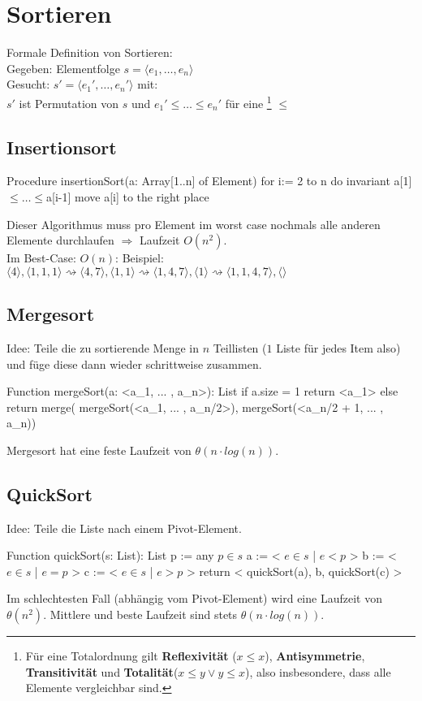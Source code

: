 \section{Sortieren}
Formale Definition von Sortieren:\\
Gegeben: Elementfolge $s = \langle e_1, \dots, e_n \rangle$\\
Gesucht: $s'=\langle e_1',\dots,e_n'\rangle$ mit:\\
$s'$ ist Permutation von $s$ und $e_1'\leq\dots\leq e_n'$ für eine 
 \footnote{Für eine Totalordnung gilt \textbf{Reflexivität} ($x\leq x$), \textbf{Antisymmetrie}, \textbf{Transitivität} und \textbf{Totalität}($x\leq y \lor y \leq x$), also insbesondere, dass alle Elemente vergleichbar sind.}
$\leq$

\subsection{Insertionsort}
\begin{PseudoCode}[caption=Insertion Sort]
Procedure insertionSort(a: Array[1..n] of Element)
    for i:= 2 to n do
        invariant a[1] $\leq\dots\leq$a[i-1]
        move a[i] to the right place
\end{PseudoCode}
Dieser Algorithmus muss pro Element im worst case nochmals alle anderen Elemente durchlaufen $\Rightarrow$ Laufzeit $O(n^2)$.\\
Im Best-Case: $O(n)$:
Beispiel: $\langle4\rangle,\langle1,1,1\rangle\rightsquigarrow\langle4,7\rangle,\langle1,1\rangle\rightsquigarrow\langle1,4,7\rangle,\langle1\rangle\rightsquigarrow\langle1,1,4,7\rangle,\langle\rangle$

\subsection{Mergesort}
Idee: Teile die zu sortierende Menge in $n$ Teillisten ($1$ Liste für jedes Item also) und füge diese dann wieder schrittweise zusammen.
\begin{PseudoCode}[caption=Merge Sort]
Function mergeSort(a: <a_1, ... , a_n>): List
    if a.size = 1
        return <a_1>
    else
        return merge(
            mergeSort(<a_1, ... , a_n/2>),
            mergeSort(<a_n/2 + 1, ... , a_n))
\end{PseudoCode}

Mergesort hat eine feste Laufzeit von $\theta(n\cdot log(n))$.

\subsection{QuickSort}
Idee: Teile die Liste nach einem Pivot-Element.
\begin{PseudoCode}[caption=Quick Sort]
Function quickSort(s: List): List
    p := any $p\in s$
    a := < $e\in s$ | $e<p$ >
    b := < $e\in s$ | $e=p$ >
    c := < $e\in s$ | $e>p$ >
    return < quickSort(a), b, quickSort(c) >
\end{PseudoCode}
Im schlechtesten Fall (abhängig vom Pivot-Element) wird eine Laufzeit von $\theta(n^2)$. Mittlere und beste Laufzeit sind stets $\theta(n\cdot log (n))$.

